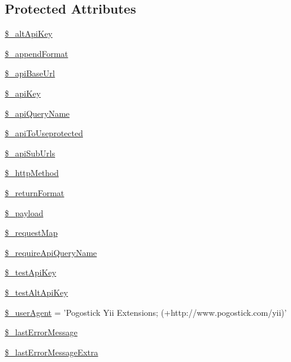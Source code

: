 \subsection*{Protected Attributes}
\begin{DoxyCompactItemize}
\item 
\hyperlink{classCPSApiComponent_a3bb30fd55481cc30ef96aa61d1b523b6}{\$\_\-altApiKey}
\item 
\hyperlink{classCPSApiComponent_ae027f791b6a2fc198dfabc3e2693f585}{\$\_\-appendFormat}
\item 
\hyperlink{classCPSApiComponent_a2a3098653897c46b33497dd90b807f64}{\$\_\-apiBaseUrl}
\item 
\hyperlink{classCPSApiComponent_a30d859488ed1921f08a7e8191363d9a4}{\$\_\-apiKey}
\item 
\hyperlink{classCPSApiComponent_adb92b727d9e245493a2001eca37693de}{\$\_\-apiQueryName}
\item 
\hyperlink{classCPSApiComponent_abdfb5848bea7acb66e39972358f344a8}{\$\_\-apiToUseprotected}
\item 
\hyperlink{classCPSApiComponent_aee5e6cb1a983f0bd5f57cefdd5a97241}{\$\_\-apiSubUrls}
\item 
\hyperlink{classCPSApiComponent_a1fa7e8f053c645c627f16bcf41f2416a}{\$\_\-httpMethod}
\item 
\hyperlink{classCPSApiComponent_a7ea52a3850e51717b6268b7b9e468684}{\$\_\-returnFormat}
\item 
\hyperlink{classCPSApiComponent_a01bc135256923b2605138f01e3f81d76}{\$\_\-payload}
\item 
\hyperlink{classCPSApiComponent_ae2824a887a5fbea2092a494eac8471bb}{\$\_\-requestMap}
\item 
\hyperlink{classCPSApiComponent_ab068ac6d8ffe672d108a88b51f766294}{\$\_\-requireApiQueryName}
\item 
\hyperlink{classCPSApiComponent_a539fd69c22d2f9c368e410d3542cd5a6}{\$\_\-testApiKey}
\item 
\hyperlink{classCPSApiComponent_a043b72271c216d07a270d5b57a17fe59}{\$\_\-testAltApiKey}
\item 
\hyperlink{classCPSApiComponent_a901ed68c5b7f6b758cc90b00197ca88b}{\$\_\-userAgent} = 'Pogostick Yii Extensions; (+http://www.pogostick.com/yii)'
\item 
\hyperlink{classCPSApiComponent_a204d1af51663d8a1317949e796fe5fca}{\$\_\-lastErrorMessage}
\item 
\hyperlink{classCPSApiComponent_a15913094186791f856e0e5eb23883ba3}{\$\_\-lastErrorMessageExtra}

\end{DoxyCompactItemize}
